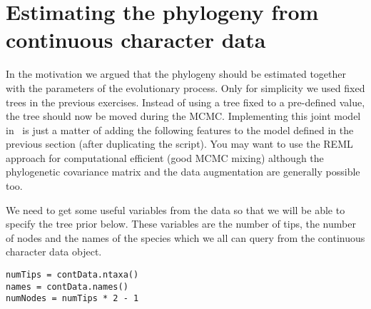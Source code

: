 \section{Estimating the phylogeny from continuous character data}
In the motivation we argued that the phylogeny should be estimated together with the parameters of the evolutionary process. Only for simplicity we used fixed trees in the previous exercises.
Instead of using a tree fixed to a pre-defined value, the tree should now be moved during the MCMC.
Implementing this joint model in \RevBayes~is just a matter of adding the following features to the model defined in the previous section (after duplicating the script).
You may want to use the REML approach for computational efficient (\IE good MCMC mixing) although the phylogenetic covariance matrix and the data augmentation are generally possible too.


We need to get some useful variables from the data so that we will be able to specify the tree prior below. These variables are the number of tips, the number of nodes and the names of the species which we all can query from the continuous character data object.
{\tt \small \begin{snugshade*}
\begin{lstlisting}
numTips = contData.ntaxa()
names = contData.names()
numNodes = numTips * 2 - 1
\end{lstlisting}
\end{snugshade*}}

